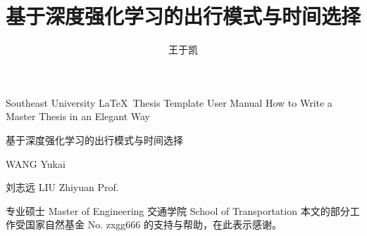 \documentclass[algorithmlist,figurelist,tablelist,nomlist]{template/seumasterthesis}
\begin{document}

\title
    {基于深度强化学习的出行模式与时间选择}        %
    {}         %
    {Southeast University \LaTeX ~Thesis Template User Manual}  %
    {How to Write a Master Thesis in an Elegant Way}            %

\spine
    {基于深度强化学习的出行模式与时间选择} 
    {}                                                               

\author
    {王于凯}                        %
    {WANG Yukai}                  %

\advisor
    {刘志远}                %
    {LIU Zhiyuan}        %
    {Prof.}                     %
    
\degreetype                        %
    {专业硕士}
    {Master of Engineering}
\authorizedate{}                  %
\committeechair{}               %
\reviewer{}{}            %
\department                        %
    {交通学院}
    {School of Transportation}
\seuthesisthanks                %
    {本文的部分工作受国家自然基金 No. zxgg666 的支持与帮助，在此表示感谢。}
\end{document}
